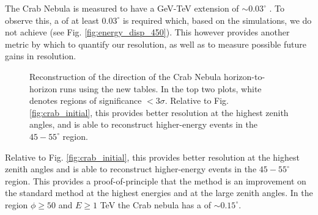 \documentclass[main.tex]{subfiles}
\begin{document}
The Crab Nebula is measured to have a GeV-TeV extension of $\sim 0.03^\circ$ \cite{Fermi_LAT_Crab_extension}\cite{HESS_Crab_extension}. To observe this, a \rse of at least $0.03^\circ$ is required which, based on the simulations, we do not achieve (see Fig. \ref{fig:energy_disp_450}). This however provides another metric by which to quantify our resolution, as well as to measure possible future gains in resolution.


\begin{figure}[H]
  \begin{center}
  \end{center}
  \caption[Crab (horizon-to-horizon runs) direction reconstruction using Method5t.]{Reconstruction of the direction of the Crab Nebula horizon-to-horizon runs using the new \disp tables. In the top two plots, white denotes regions of significance $<3\sigma$. Relative to Fig. \ref{fig:crab_initial}, this provides better resolution at the highest zenith angles, and is able to reconstruct higher-energy events in the $45-55^\circ$ region.}
  \label{fig:crab_disp}
\end{figure}
Relative to Fig. \ref{fig:crab_initial}, this provides better resolution at the highest zenith angles and is able to reconstruct higher-energy events in the $45-55^\circ$ region. This provides a proof-of-principle that the \disp method is an improvement on the standard method at the highest energies and at the large zenith angles. In the region $\phi\geq50$ and $E\geq 1$ TeV the Crab nebula has a \rse of $\sim 0.15^\circ$.
\end{document}
